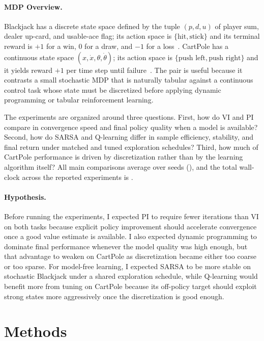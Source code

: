 \documentclass[letterpaper, 10 pt, conference]{ieeeconf}
\begin{document}
\paragraph{MDP Overview.}
Blackjack has a discrete state space defined by the tuple $(p, d, u)$ of player sum, dealer up-card, and usable-ace flag; its action space is $\{\text{hit}, \text{stick}\}$ and its terminal reward is $+1$ for a win, $0$ for a draw, and $-1$ for a loss~\cite{sutton2018reinforcement}. CartPole has a continuous state space $(x, \dot{x}, \theta, \dot{\theta})$; its action space is $\{\text{push left}, \text{push right}\}$ and it yields reward $+1$ per time step until failure~\cite{barto1983neuronlike}. The pair is useful because it contrasts a small stochastic MDP that is naturally tabular against a continuous control task whose state must be discretized before applying dynamic programming or tabular reinforcement learning.

The experiments are organized around three questions. First, how do VI and PI compare in convergence speed and final policy quality when a model is available? Second, how do SARSA and Q-learning differ in sample efficiency, stability, and final return under matched and tuned exploration schedules? Third, how much of CartPole performance is driven by discretization rather than by the learning algorithm itself? All main comparisons average over \NumSeeds seeds (\SeedList), and the total wall-clock across the reported experiments is \WallClockTotal.

\paragraph{Hypothesis.}
Before running the experiments, I expected PI to require fewer iterations than VI on both tasks because explicit policy improvement should accelerate convergence once a good value estimate is available. I also expected dynamic programming to dominate final performance whenever the model quality was high enough, but that advantage to weaken on CartPole as discretization became either too coarse or too sparse. For model-free learning, I expected SARSA to be more stable on stochastic Blackjack under a shared exploration schedule, while Q-learning would benefit more from tuning on CartPole because its off-policy target should exploit strong states more aggressively once the discretization is good enough.

\section{Methods}
\end{document}
